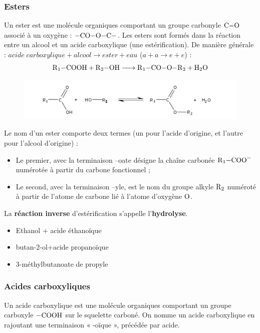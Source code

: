 \documentclass[11pt,a4paper]{article}
\begin{document}
\subsubsection*{Esters}
Un ester est une molécule organiques comportant un groupe carbonyle $\ce{C=O}$ associé à un oxygène : $\ce{-CO-O-C-}$. Les esters sont formés dans la réaction entre un alcool et un acide carboxylique (une estérification). De manière générale : $acide\; carboxylique+alcool\rightarrow ester+eau$ ($a+a\rightarrow e+e$) : 
\[ \ce{R1-COOH + R2-OH -> R1-CO-O-R2 + H2O}  \]
\begin{figure}[h]
    \centering
    \includegraphics[width=\linewidth]{imgs/c5/esterific.jpg}
\end{figure}

Le nom d'un ester comporte deux termes (un pour l'acide d'origine, et l'autre pour l'alcool d'origine) :
\begin{itemize}
    \item Le premier, avec la terminaison –oate désigne la chaîne carbonée $\ce{R_1-COO-}$ numérotée à partir du carbone fonctionnel ;
    \item Le second, avec la terminaison –yle, est le nom du groupe alkyle $\ce{R_2}$  numéroté à partir de l’atome de carbone lié à l’atome d’oxygène $\ce{O}$. 
\end{itemize}
La \textbf{réaction inverse} d'estérification s'appelle l'\textbf{hydrolyse}. 

\begin{eg}
\begin{itemize}
    \item Ethanol + acide éthanoïque
\vspace{1cm}
	\item butan-2-ol+acide propanoïque
\vspace{1cm}
    \item 3-méthylbutanoate de propyle
\vspace{1cm}
\end{itemize}
\end{eg}

\subsubsection*{Acides carboxyliques}
Un acide carboxylique est une molécule organiques comportant un groupe carboxyle $\ce{-COOH}$ sur le squelette carboné. On nomme un acide carboxylique en rajoutant une terminaison « -oïque », précédée par acide. 
\end{document}
